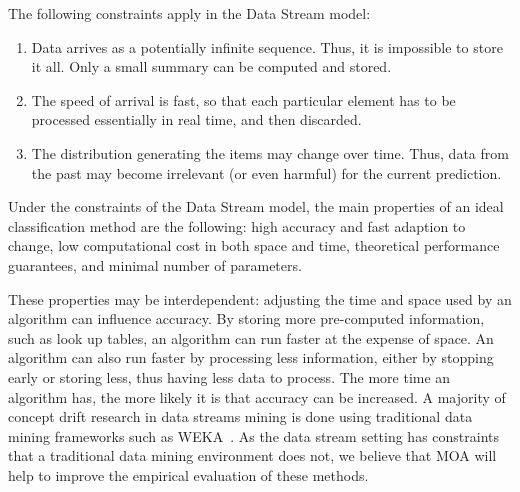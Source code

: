 The following constraints apply in the Data Stream model:
\begin{enumerate}
\item  Data arrives as a potentially infinite sequence. Thus, it is impossible
 to store it all. Only a small summary can be computed and stored. %
\item The speed of arrival is fast, so that each particular element has to be 
processed essentially in real time, and then discarded.
\item The distribution generating the items may change over time. Thus, data from 
the past may become irrelevant (or even harmful) for the current prediction.
\end{enumerate}
Under the constraints of the Data Stream model,
the main properties of an ideal classification method %
are the following:
high accuracy and fast adaption to change,
low computational cost in both space and time,
theoretical performance guarantees, 
and minimal number of parameters.

These properties may be interdependent: adjusting the time and space used 
by an algorithm can influence accuracy. By storing more pre-computed information, 
such as look up tables, an algorithm can run faster at the expense of
space. An algorithm can also run faster by processing less information, either
by stopping early or storing less, thus having less data to process. The more
time an algorithm has, the more likely it is that accuracy can be
increased.
\ENDOMIT
A majority of concept drift research in data streams mining is done using
traditional data mining frameworks such as WEKA~\cite{weka}. As the data stream 
setting has constraints that a traditional data mining environment does not, 
we believe that MOA will help to improve the empirical
evaluation of these methods. 

